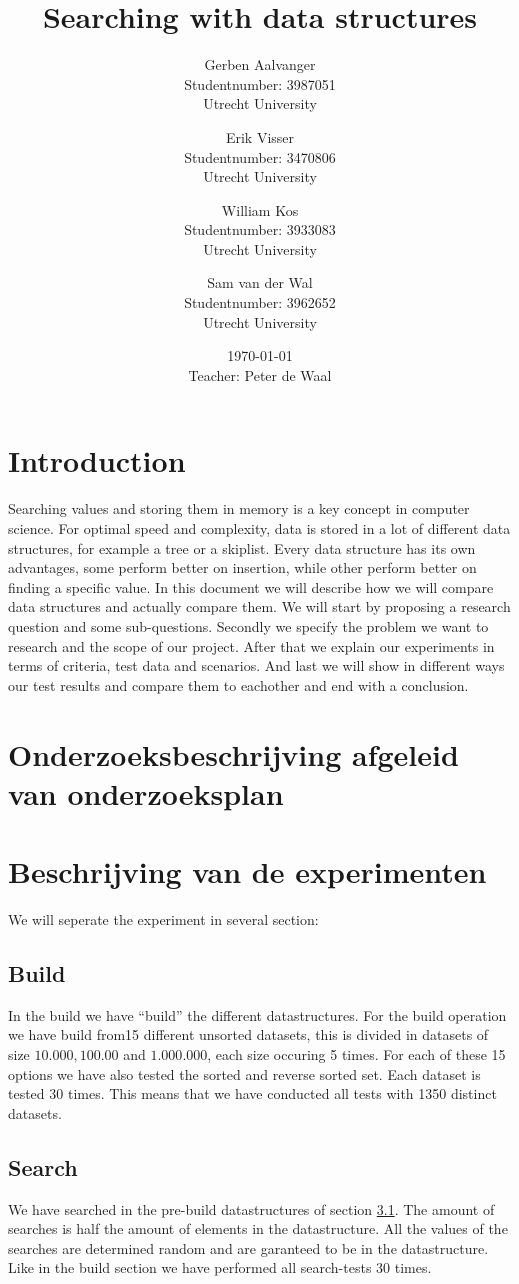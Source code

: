 \documentclass{article}
\title{Searching with data structures}
\author{
		Gerben Aalvanger\\ 
	        	Studentnumber: 3987051 \\
	        	Utrecht University
			\and
		Erik Visser\\
	        	Studentnumber: 3470806 \\
	        	Utrecht University
	        	\and
	        	William Kos\\
	        	Studentnumber: 3933083\\
	        	Utrecht University\\
	        	\and
	        	Sam van der Wal\\
	        	Studentnumber: 3962652\\
	        	Utrecht University}
\date{\today \\Teacher: Peter de Waal}
\begin{document}
\maketitle
\section{Introduction}
Searching values and storing them in memory is a key concept in computer science. For optimal speed and complexity, data is stored in a lot of different data structures, for example a tree or a skiplist. Every data structure has its own advantages, some perform better on insertion, while other perform better on finding a specific value. In this document we will describe how we will compare data structures and actually compare them. We will start by proposing a research question and some sub-questions. Secondly we specify the problem we want to research and the scope of our project. After that we explain our experiments in terms of criteria, test data and scenarios. And last we will show in different ways our test results and compare them to eachother and end with a conclusion. 

\section{Onderzoeksbeschrijving afgeleid van onderzoeksplan}
\section{Beschrijving van de experimenten}
We will seperate the experiment in several section:
\subsection{Build}
\label{Build}
In the build we have ``build'' the different datastructures. 
For the build operation we have build from15 different unsorted datasets, this is divided in datasets of size $10.000, 100.00$ and $1.000.000$, each size occuring 5 times.  For each of these 15 options we have also tested the sorted and reverse sorted set. Each dataset is tested 30 times. This means that we have conducted all tests with 1350 distinct datasets.
\subsection{Search}
We have searched in the pre-build datastructures of section \ref{Build}. The amount of searches is half the amount of elements in the datastructure. All the values of the searches are determined random and are garanteed to be in the datastructure. Like in the build section we have performed all search-tests 30 times. 
\end{document}
